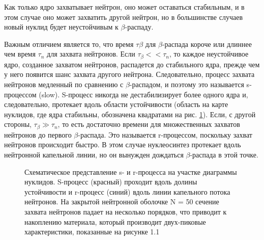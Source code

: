 \documentclass[%
master,    %
natbib,      %
subf,        %
href,        %
colorlinks,  %
]{disser}
\begin{document}
Как только ядро захватывает нейтрон, оно может оставаться стабильным, и в этом случае оно может захватить другой нейтрон, но в большинстве случаев новый нуклид будет неустойчивым к $\beta$-распаду.

Важным отличием является то, что время $\tau\beta$ для $\beta$-распада короче или длиннее чем время $\tau_n$ для захвата нейтронов. Если $\tau_\beta << \tau_n$, то каждое неустойчивое ядро, созданное захватом нейтронов, распадется до стабильного ядра, прежде чем у него появится шанс захвата другого нейтрона. Следовательно, процесс захвата нейтронов медленный по сравнению с $\beta$-распадом, и поэтому это называется s-процессом (slow). S-процесс никогда не дестабилизирует более одного ядра и, следовательно, протекает вдоль области устойчивости (область на карте нуклидов, где ядра стабильны, обозначена квадратами на рис. \ref{ris:6}). Если, с другой стороны, $\tau_\beta \gg \tau_n$, то есть достаточно времени для множественных захватов нейтронов до первого $\beta$-распада. Это называется r-процессом, поскольку захват нейтронов происходит быстро. В этом случае нуклеосинтез протекает вдоль нейтронной капельной линии, но он вынужден дождаться $\beta$-распада в этой точке.

\begin{figure}[h]
	\caption{Схематическое представление s- и r-процесса на участке диаграммы нуклидов. S-процесс (красный) проходит вдоль долины устойчивости и r-процесс (синий) вдоль линии капельного потока нейтронов. На закрытой нейтронной оболочке N = 50 сечение захвата нейтронов падает на несколько порядков, что приводит к накоплению материала, который производит двух-пиковые характеристики, показанные на рисунке 1.1}
	\label{ris:6}
\end{figure}
\end{document}
